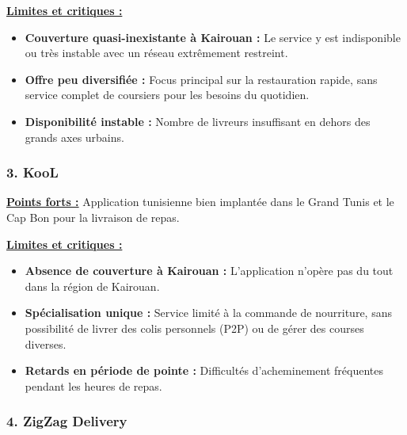 \documentclass[12pt,fleqn,a4paper]{report}
\begin{document}
\begin{justify}
\vspace{0.2cm}
\noindent \textbf{\underline{Limites et critiques :}}
\begin{itemize}
    \item \textbf{Couverture quasi-inexistante à Kairouan :} Le service y est indisponible ou très instable avec un réseau extrêmement restreint.
    \item \textbf{Offre peu diversifiée :} Focus principal sur la restauration rapide, sans service complet de coursiers pour les besoins du quotidien.
    \item \textbf{Disponibilité instable :} Nombre de livreurs insuffisant en dehors des grands axes urbains.
\end{itemize}

\vspace{0.5cm}

\subsubsection*{\Large \textbf{3. KooL}}
\vspace{0.2cm}

\noindent \textbf{\underline{Points forts :}}
Application tunisienne bien implantée dans le Grand Tunis et le Cap Bon pour la livraison de repas.

\vspace{0.2cm}
\noindent \textbf{\underline{Limites et critiques :}}
\begin{itemize}
    \item \textbf{Absence de couverture à Kairouan :} L'application n'opère pas du tout dans la région de Kairouan.
    \item \textbf{Spécialisation unique :} Service limité à la commande de nourriture, sans possibilité de livrer des colis personnels (P2P) ou de gérer des courses diverses.
    \item \textbf{Retards en période de pointe :} Difficultés d'acheminement fréquentes pendant les heures de repas.
\end{itemize}

\vspace{0.5cm}

\subsubsection*{\Large \textbf{4. ZigZag Delivery}}
\vspace{0.2cm}


\end{justify}
\end{document}
